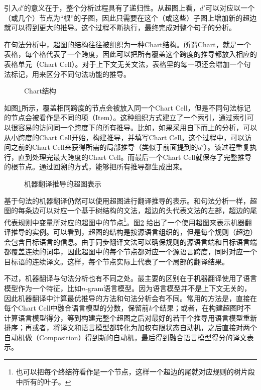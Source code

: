 \parinterval 引入$d'$的意义在于，整个分析过程具有了递归性。从超图上看，$d'$可以对应以一个（或几个）节点为``根''的子图，因此只需要在这个（或这些）子图上增加新的超边就可以得到更大的推导。这个过程不断执行，最终完成对整个句子的分析。

\parinterval 在句法分析中，超图的结构往往被组织为一种Chart结构。所谓Chart，就是一个表格，每个格代表了一个跨度，因此可以把所有覆盖这个跨度的推导都放入相应的表格单元（Chart Cell）。对于上下文无关文法，表格里的每一项还会增加一个句法标记，用来区分不同句法功能的推导。

\begin{figure}[htp]
\centering

\caption{Chart结构}
\label{fig:4-65}
\end{figure}

\parinterval 如图\ref{fig:4-65}所示，覆盖相同跨度的节点会被放入同一个Chart Cell，但是不同句法标记的节点会被看作是不同的项（Item）。这种组织方式建立了一个索引，通过索引可以很容易的访问同一个跨度下的所有推导。比如，如果采用自下而上的分析，可以从小跨度的Chart Cell开始，构建推导，并填写Chart Cell。这个过程中，可以访问之前的Chart Cell来获得所需的局部推导（类似于前面提到的$d'$）。该过程重复执行，直到处理完最大跨度的Chart Cell。而最后一个Chart Cell就保存了完整推导的根节点。通过回溯的方式，能够把所有推导都生成出来。

\begin{figure}[htp]
\centering

\caption{机器翻译推导的超图表示}
\label{fig:4-66}
\end{figure}

\parinterval 基于句法的机器翻译仍然可以使用超图进行翻译推导的表示。和句法分析一样，超图的每条边可以对应一个基于树结构的文法，超边的头代表文法的左部，超边的尾代表规则中变量所对应的超图中的节点\footnote[10]{ 也可以把每个终结符看作是一个节点，这样一个超边的尾就对应规则的树片段中所有的叶子。}。图\ref{fig:4-66} 给出了一个使用超图来表示机器翻译推导的实例。可以看到，超图的结构是按源语言组织的，但是每个规则（超边）会包含目标语言的信息。由于同步翻译文法可以确保规则的源语言端和目标语言端都覆盖连续的词串，因此超图中的每个节点都对应一个源语言跨度，同时对应一个目标语的连续译文。这样，每个节点实际上代表了一个局部的翻译结果。

\parinterval 不过，机器翻译与句法分析也有不同之处。最主要的区别在于机器翻译使用了语言模型作为一个特征，比如$n$-gram语言模型。因为语言模型并不是上下文无关的，因此机器翻译中计算最优推导的方法和句法分析会有不同。常用的方法是，直接在每个Chart Cell中融合语言模型的分数，保留前$k$个结果；或者，在构建超图时不计算语言模型得分，等到构建完整个超图之后对最好的若干个推导用语言模型重新排序；再或者，将译文和语言模型都转化为加权有限状态自动机，之后直接对两个自动机做{\small{}}（Composition）得到新的自动机，最后得到融合语言模型得分的译文表示。

